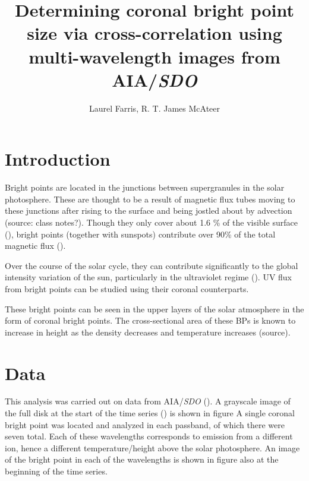\documentclass[preprint2]{aastex}
\begin{document}
\title{Determining coronal bright point size via cross-correlation using
multi-wavelength images from AIA/\textit{SDO}}
\author{Laurel Farris, R. T. James McAteer}

\begin{abstract}
\end{abstract}

\section{Introduction}\label{intro}

Bright points are located in the junctions between supergranules in the solar
photosphere. These are thought to be a result of magnetic flux tubes moving to
these junctions after rising to the surface and being jostled about by
advection (source: class notes?). Though they only cover about 1.6 \% of the
visible surface (\cite{Srivastava}), bright points (together with sunspots)
contribute over 90\% of the total magnetic flux (\cite{Howard}).

Over the course of the solar cycle, they can contribute significantly to the
global intensity variation of the sun, particularly in the ultraviolet
regime (\cite{Riethmuller}). UV flux from bright points can be studied using
their coronal counterparts.

These bright points can be seen in the upper layers of the solar atmosphere in
the form of coronal bright points. The cross-sectional area of these BPs is
known to increase in height as the density decreases and temperature increases
(source).


\section{Data}\label{data}
This analysis was carried out on data from AIA/\textit{SDO} (\cite{Lemen}).
A grayscale image of the full disk at the start of the time series () is shown
in figure %
A single coronal bright point was located and analyzed in each passband, of
which there were seven total. Each of these wavelengths corresponds to emission
from a different ion, hence a different temperature/height above the solar
photosphere.
An image of the bright point in each of the wavelengths is shown in figure
also at the beginning of the time series.
\end{document}
